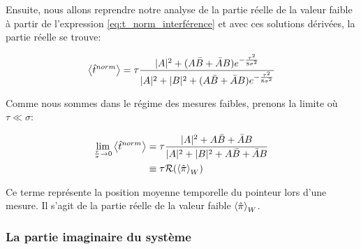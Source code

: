 \begin{onehalfspace}
    \noindent Ensuite, nous allons reprendre notre analyse de la 
    partie réelle de la valeur faible à partir de 
    l'expression \eqref{eq:t_norm_interférence} et avec 
    ces solutions dérivées, la partie réelle se trouve:

    \begin{align}
        \expval{\hat{t}^{norm}} = \tau\frac{|A|^2 + (A\bar{B} + \bar{A}B)e^{-\frac{\tau^2}{8\sigma^2}}}{|A|^2 + |B|^2 + (A\bar{B} + \bar{A}B)e^{-\frac{\tau^2}{8\sigma^2}}}
        \label{eq:expval_t_norm}
    \end{align}

   \noindent Comme nous sommes dans le régime des mesures faibles, 
   prenons la limite où $\tau \ll \sigma$:

    \begin{align}
        \lim_{\frac{\tau}{\sigma} \to 0} \expval{\hat{t}^{norm}} &= \tau\frac{|A|^2 + A\bar{B} + \bar{A}B}{|A|^2 + |B|^2 + A\bar{B} + \bar{A}B}\\
        &\equiv \tau \mathcal{R}(\expval{\hat{\pi}}_W)
    \end{align}

    \noindent Ce terme représente la position moyenne temporelle du 
    pointeur lors d’une mesure. Il s’agit de la partie réelle de la 
    valeur faible $\expval{\hat{\pi}}_W$.
\end{onehalfspace}

\subsubsection{La partie imaginaire du système}
    
